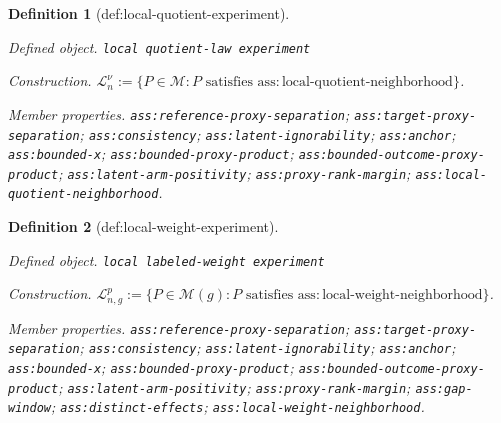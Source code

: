 \documentclass{article}
\newtheorem{definition}{Definition}
\begin{document}
\begin{definition}[def:local-quotient-experiment]\label{def:local-quotient-experiment}
\par\smallskip\noindent\emph{Defined object.} \texttt{local quotient-\allowbreak{}law experiment}
\par\smallskip\noindent\emph{Construction.} \(\mathcal L_{n}^{\nu}:=\{P\in\mathcal M:P\text{ satisfies }\mathrm{ass:local\text{-}quotient\text{-}neighborhood}\}\).
\par\smallskip\noindent\emph{Member properties.} \texttt{ass:\allowbreak{}reference-\allowbreak{}proxy-\allowbreak{}separation}; \texttt{ass:\allowbreak{}target-\allowbreak{}proxy-\allowbreak{}separation}; \texttt{ass:\allowbreak{}consistency}; \texttt{ass:\allowbreak{}latent-\allowbreak{}ignorability}; \texttt{ass:\allowbreak{}anchor}; \texttt{ass:\allowbreak{}bounded-\allowbreak{}x}; \texttt{ass:\allowbreak{}bounded-\allowbreak{}proxy-\allowbreak{}product}; \texttt{ass:\allowbreak{}bounded-\allowbreak{}outcome-\allowbreak{}proxy-\allowbreak{}product}; \texttt{ass:\allowbreak{}latent-\allowbreak{}arm-\allowbreak{}positivity}; \texttt{ass:\allowbreak{}proxy-\allowbreak{}rank-\allowbreak{}margin}; \texttt{ass:\allowbreak{}local-\allowbreak{}quotient-\allowbreak{}neighborhood}.
\end{definition}

\begin{definition}[def:local-weight-experiment]\label{def:local-weight-experiment}
\par\smallskip\noindent\emph{Defined object.} \texttt{local labeled-\allowbreak{}weight experiment}
\par\smallskip\noindent\emph{Construction.} \(\mathcal L_{n,g}^{p}:=\{P\in\mathcal M(g):P\text{ satisfies }\mathrm{ass:local\text{-}weight\text{-}neighborhood}\}\).
\par\smallskip\noindent\emph{Member properties.} \texttt{ass:\allowbreak{}reference-\allowbreak{}proxy-\allowbreak{}separation}; \texttt{ass:\allowbreak{}target-\allowbreak{}proxy-\allowbreak{}separation}; \texttt{ass:\allowbreak{}consistency}; \texttt{ass:\allowbreak{}latent-\allowbreak{}ignorability}; \texttt{ass:\allowbreak{}anchor}; \texttt{ass:\allowbreak{}bounded-\allowbreak{}x}; \texttt{ass:\allowbreak{}bounded-\allowbreak{}proxy-\allowbreak{}product}; \texttt{ass:\allowbreak{}bounded-\allowbreak{}outcome-\allowbreak{}proxy-\allowbreak{}product}; \texttt{ass:\allowbreak{}latent-\allowbreak{}arm-\allowbreak{}positivity}; \texttt{ass:\allowbreak{}proxy-\allowbreak{}rank-\allowbreak{}margin}; \texttt{ass:\allowbreak{}gap-\allowbreak{}window}; \texttt{ass:\allowbreak{}distinct-\allowbreak{}effects}; \texttt{ass:\allowbreak{}local-\allowbreak{}weight-\allowbreak{}neighborhood}.
\end{definition}
\end{document}
